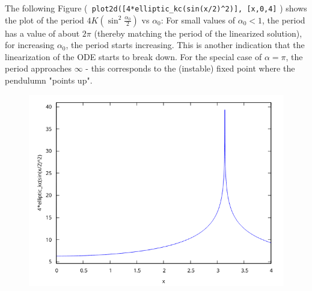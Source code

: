 The following Figure (\verb+ plot2d([4*elliptic_kc(sin(x/2)^2)], [x,0,4]+ ) shows the plot of the period $4 K \left( \sin^2 \frac{\alpha_0}{2} \right)$ vs $\alpha_0$: For small values of $\alpha_0 < 1$, the period has a value of about $2\pi$ (thereby matching the period of the linearized solution), for increasing $\alpha_0$, the period starts increasing. This is another indication that the linearization of the ODE starts to break down. For the special case of $\alpha = \pi$, the period approaches $\infty$ - this corresponds to the (instable) fixed point where the pendulumn "points up".

\begin{figure}[H]
    \centering
    \includegraphics[scale=0.75]{images/2024-09-13-period.png}
\end{figure}


